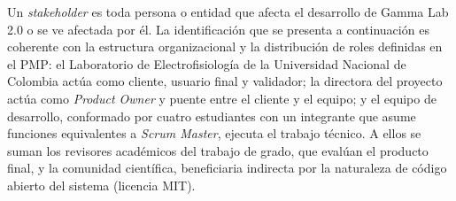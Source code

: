 \documentclass[11pt,a4paper]{article}
\DeclareRobustCommand{\_}{\textunderscore\allowbreak}
\begin{document}
Un \textit{stakeholder} es toda persona o entidad que afecta el desarrollo de Gamma Lab 2.0 o se ve afectada por él. La identificación que se presenta a continuación es coherente con la estructura organizacional y la distribución de roles definidas en el PMP: el Laboratorio de Electrofisiología de la Universidad Nacional de Colombia actúa como cliente, usuario final y validador; la directora del proyecto actúa como \textit{Product Owner} y puente entre el cliente y el equipo; y el equipo de desarrollo, conformado por cuatro estudiantes con un integrante que asume funciones equivalentes a \textit{Scrum Master}, ejecuta el trabajo técnico. A ellos se suman los revisores académicos del trabajo de grado, que evalúan el producto final, y la comunidad científica, beneficiaria indirecta por la naturaleza de código abierto del sistema (licencia MIT).
\end{document}
